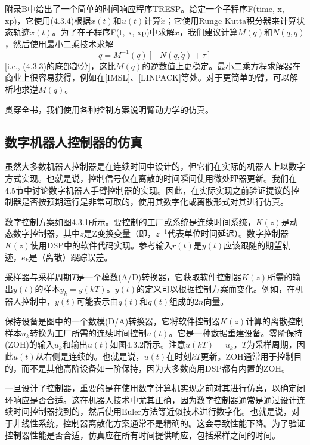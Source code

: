 \documentclass[UTF8]{ctexart}
\theoremstyle{definition}
\begin{document}
附录B中给出了一个简单的时间响应程序TRESP。给定一个子程序F(time, x, xp)，它使用(4.3.4)根据$x(t)$和$u(t)$计算$\dot{x}$；它使用Runge-Kutta积分器来计算状态轨迹$x(t)$。为了在子程序F(t, x, xp)中求解$\dot{x}$，我们建议计算$M(q)$和$N(q, \dot{q})$，然后使用最小二乘技术求解
\begin{equation}
    \ddot{q} = M^{-1}(q)[-N(q, \dot{q}) + \tau]
\end{equation}
[i.e., (4.3.3)的底部部分]，这比$M(q)$的逆数值上更稳定。最小二乘方程求解器在商业上很容易获得，例如在[IMSL]、[LINPACK]等处。对于更简单的臂，可以解析地求逆$M(q)$。

贯穿全书，我们使用各种控制方案说明臂动力学的仿真。

\subsection{数字机器人控制器的仿真}

虽然大多数机器人控制器是在连续时间中设计的，但它们在实际的机器人上以数字方式实现。也就是说，控制信号仅在离散的时间瞬间使用微处理器更新。我们在4.5节中讨论数字机器人手臂控制器的实现。因此，在实际实现之前验证提议的控制器是否按预期运行是非常可取的，使用其数字化或离散形式对其进行仿真。

数字控制方案如图4.3.1所示。要控制的工厂或系统是连续时间系统，$K(z)$是动态数字控制器，其中$z$是Z变换变量（即，$z^{-1}$代表单位时间延迟）。数字控制器$K(z)$使用DSP中的软件代码实现。参考输入$r(t)$是$y(t)$应该跟随的期望轨迹，$e_k$是（离散）跟踪误差。

采样器与采样周期$T$是一个模数(A/D)转换器，它获取软件控制器$K(z)$所需的输出$y(t)$的样本$y_k = y(kT)$。$y(t)$的定义可以根据控制方案而变化。例如，在机器人控制中，$y(t)$可能表示由$q(t)$和$\dot{q}(t)$组成的$2n$向量。

保持设备是图中的一个数模(D/A)转换器，它将软件控制器$K(z)$计算的离散控制样本$u_k$转换为工厂所需的连续时间控制$u(t)$。它是一种数据重建设备。零阶保持(ZOH)的输入$u_k$和输出$u(t)$如图4.3.2所示。注意$u(kT) = u_k$，$T$为采样周期，因此$u(t)$从右侧是连续的。也就是说，$u(t)$在时刻$kT$更新。ZOH通常用于控制目的，而不是其他高阶设备如一阶保持，因为大多数商用DSP都有内置的ZOH。

一旦设计了控制器，重要的是在使用数字计算机实现之前对其进行仿真，以确定闭环响应是否合适。这在机器人技术中尤其正确，因为数字控制器通常是通过设计连续时间控制器找到的，然后使用Euler方法等近似技术进行数字化。也就是说，对于非线性系统，控制器离散化方案通常不是精确的。这会导致性能下降。为了验证控制器性能是否合适，仿真应在所有时间提供响应，包括采样之间的时间。
\end{document}

